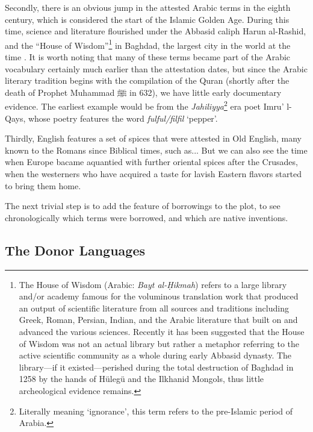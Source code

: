 Secondly, there is an obvious jump in the attested Arabic terms in the eighth century, which is considered the start of the Islamic Golden Age. During this time, science and literature flourished under the Abbasid caliph Harun al-Rashid, and the ``House of Wisdom''\footnote{The House of Wisdom (Arabic: \textit{Bayt al-Ḥikmah}) refers to a large library and/or academy famous for the voluminous translation work that produced an output of scientific literature from all sources and traditions including Greek, Roman, Persian, Indian, and the Arabic literature that built on and advanced the various sciences. Recently it has been suggested that the House of Wisdom was not an actual library but rather a metaphor referring to the active scientific community as a whole during early Abbasid dynasty. The library---if it existed---perished during the total destruction of Baghdad in 1258 by the hands of Hülegü and the Ilkhanid Mongols, thus little archeological evidence remains.} in Baghdad, the largest city in the world at the time \autocite{gutas_greek_1998}. It is worth noting that many of these terms became part of the Arabic vocabulary certainly much earlier than the attestation dates, but since the Arabic literary tradition begins with the compilation of the Quran (shortly after the death of Prophet Muhammad {ﷺ} in 632), we have little early documentary evidence. The earliest example would be from the \textit{Jahiliyya}\footnote{Literally meaning `ignorance', this term refers to the pre-Islamic period of Arabia.} era poet Imru' l-Qays, whose poetry features the word \textit{fulful/filfil} `pepper'.

Thirdly, English features a set of spices that were attested in Old English, many known to the Romans since Biblical times, such as...
But we can also see the time when Europe bacame aquantied with further oriental spices after the Crusades, when the westerners who have acquired a taste for lavish Eastern flavors started to bring them home.

The next trivial step is to add the feature of borrowings to the plot, to see chronologically which terms were borrowed, and which are native inventions. 




\subsection{The Donor Languages}

